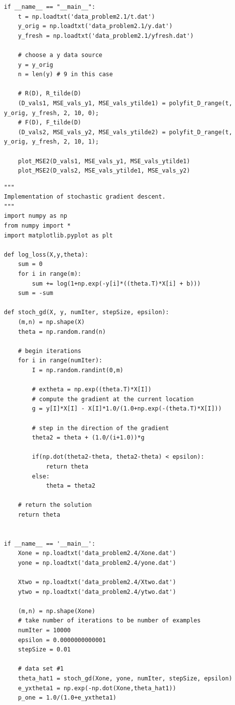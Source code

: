 \documentclass[11pt]{article}
\begin{document}
\begin{lstlisting}
if __name__ == "__main__":
	t = np.loadtxt('data_problem2.1/t.dat')
	y_orig = np.loadtxt('data_problem2.1/y.dat')
	y_fresh = np.loadtxt('data_problem2.1/yfresh.dat')

	# choose a y data source
	y = y_orig
	n = len(y) # 9 in this case

	# R(D), R_tilde(D)
	(D_vals1, MSE_vals_y1, MSE_vals_ytilde1) = polyfit_D_range(t, y_orig, y_fresh, 2, 10, 0);
	# F(D), F_tilde(D)
	(D_vals2, MSE_vals_y2, MSE_vals_ytilde2) = polyfit_D_range(t, y_orig, y_fresh, 2, 10, 1);

	plot_MSE2(D_vals1, MSE_vals_y1, MSE_vals_ytilde1)
	plot_MSE2(D_vals2, MSE_vals_ytilde1, MSE_vals_y2)

\end{lstlisting}

\begin{lstlisting}
"""
Implementation of stochastic gradient descent.
"""
import numpy as np
from numpy import *
import matplotlib.pyplot as plt

def log_loss(X,y,theta):
    sum = 0
    for i in range(m):
        sum += log(1+np.exp(-y[i]*((theta.T)*X[i] + b)))
    sum = -sum

def stoch_gd(X, y, numIter, stepSize, epsilon):
    (m,n) = np.shape(X)
    theta = np.random.rand(n)

    # begin iterations
    for i in range(numIter):
        I = np.random.randint(0,m)

        # extheta = np.exp((theta.T)*X[I])
        # compute the gradient at the current location
        g = y[I]*X[I] - X[I]*1.0/(1.0+np.exp(-(theta.T)*X[I]))

        # step in the direction of the gradient
        theta2 = theta + (1.0/(i+1.0))*g

        if(np.dot(theta2-theta, theta2-theta) < epsilon):
            return theta
        else:
            theta = theta2

    # return the solution
    return theta


if __name__ == '__main__':
    Xone = np.loadtxt('data_problem2.4/Xone.dat')
    yone = np.loadtxt('data_problem2.4/yone.dat')

    Xtwo = np.loadtxt('data_problem2.4/Xtwo.dat')
    ytwo = np.loadtxt('data_problem2.4/ytwo.dat')

    (m,n) = np.shape(Xone)
    # take number of iterations to be number of examples
    numIter = 10000
    epsilon = 0.0000000000001
    stepSize = 0.01

    # data set #1
    theta_hat1 = stoch_gd(Xone, yone, numIter, stepSize, epsilon)
    e_yxtheta1 = np.exp(-np.dot(Xone,theta_hat1))
    p_one = 1.0/(1.0+e_yxtheta1)


\end{lstlisting}
\end{document}
